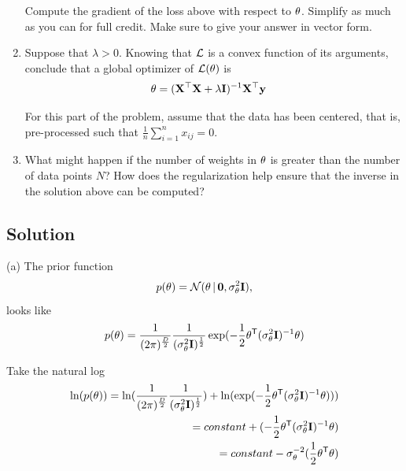 \documentclass[submit]{harvardml}
\begin{document}
\begin{problem}
\begin{enumerate}
Compute the gradient of the loss above with respect to $\mathbf{\theta}$.
Simplify as much as you can for full credit.  Make sure to give your
answer in vector form.

\item Suppose that $\lambda > 0$. Knowing that $\mathcal{L}$ is a convex function
    of its arguments, conclude that a global optimizer of
    $\mathcal{L}(\mathbf{\theta})$ is
    \begin{align}
      \mathbf{\theta} &= (\mathbf{X}^\top \mathbf{X} + \lambda \mathbf{I})^{-1} \mathbf{X}^\top \mathbf{y}
    \end{align}

For this part of the problem, assume that the data has been centered,
that is, pre-processed such that $\frac{1}{n} \sum_{i=1}^n x_{ij} = 0
$.

\item What might happen if the number of weights in $\mathbf{\theta}$ is
  greater than the number of data points $N$?  How does the
  regularization help ensure that the inverse in the solution above
  can be computed?  

\end{enumerate}

\end{problem}

\pagebreak
\subsection*{Solution}

(a) 
\noindent The prior function
\begin{align*}
p(\theta) = \mathcal{N}(\theta \,|\, \bold0, \sigma^2_\theta\mathbf{I} ),
\end{align*}
looks like
\begin{align*}
p(\theta) = \frac{1}{(2\pi)^{\frac{D}{2}}}\frac{1}{(\sigma^2_\theta\mathbf{I})^{\frac{1}{2}}}\exp(-\frac{1}{2}\theta^{\mathsf{T}}(\sigma^2_\theta\mathbf{I})^{-1}\theta)
\end{align*}

\noindent Take the natural log
\begin{align*}
\ln (p(\theta)) = \ln(\frac{1}{(2\pi)^{\frac{D}{2}}}\frac{1}{(\sigma^2_\theta\mathbf{I})^{\frac{1}{2}}}) + \ln(\exp(-\frac{1}{2}\theta^{\mathsf{T}}(\sigma^2_\theta\mathbf{I})^{-1}\theta))) \\
= constant + (-\frac{1}{2}\theta^{\mathsf{T}}(\sigma^2_\theta\mathbf{I})^{-1}\theta) \\
= constant -\sigma^{-2}_\theta(\frac{1}{2}\theta^{\mathsf{T}} \theta)
\end{align*}
\end{document}
